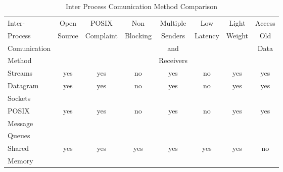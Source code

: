 
\begin{table}\label{table:ipc}
\caption{Inter Process Comunication Method Comparison}
\small
\begin{tabular}{l || c | c | c | c | c | c | c}
\hline
Inter-                          & Open        & POSIX           & Non          & Multiple    & Low         & Light   & Access \\
Process                         &      Source &       Complaint &     Blocking & Senders     &     Latency & Weight  & Old   \\
Comunication                    &             &                 &              & and         &             &         & Data          \\
Method                          &             &                 &              & Receivers   &             &         &           \\
\hline
\hline
Streams                         & yes         & yes             & no           & yes       & no          & yes     & yes \\
\hline
Datagram                        & yes         & yes             & no           & yes       & no          & yes     & yes \\
Sockets                         &             &                 &              &           &             &         &     \\
\hline

POSIX                           & yes         & yes             & no           & yes       & no          & yes     & yes\\
Message                         &             &                 &              &           &             &         &     \\
Queues                          &             &                 &              &           &             &         &     \\
\hline
Shared                          & yes         & yes             & yes          & yes       & yes         & yes     & no \\
Memory                          &             &                 &              &           &             &         &     \\


\end{tabular}
\end{table}

